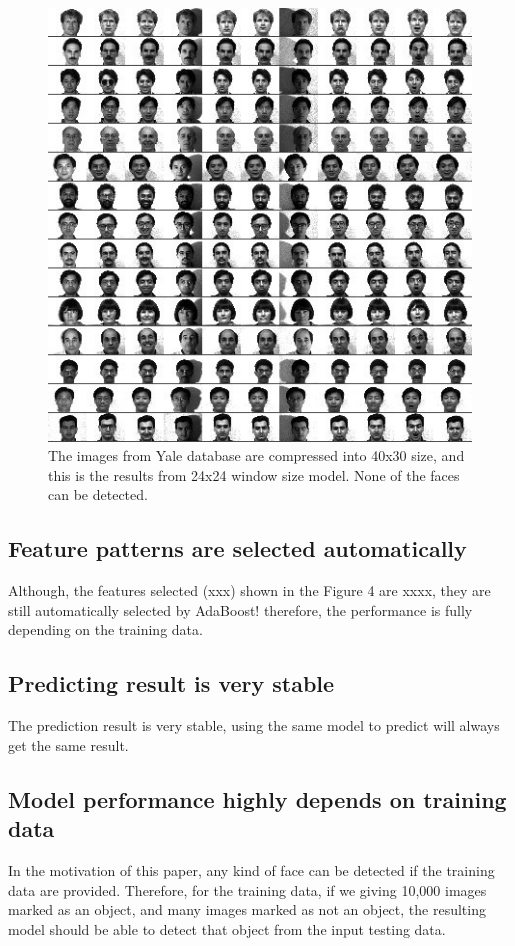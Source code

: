 \documentclass[10pt,twocolumn,letterpaper]{article}
\begin{document}
\begin{figure}[t]
    \begin{center}
        \includegraphics[width=0.9\linewidth]{yaleallsmall_ori}
    \end{center}
    \caption{The images from Yale database are compressed into 40x30 size, and this is the results from 24x24 window size model. None of the faces can be detected.}
    \label{fig:yori}
\end{figure}



\subsection{Feature patterns are selected automatically}
Although, the features selected (xxx) shown in the Figure 4 are xxxx, they are still automatically selected by AdaBoost!
therefore, the performance is fully depending on the training data.

\subsection{Predicting result is very stable}
The prediction result is very stable, using the same model to predict will always get the same result.

\subsection{Model performance highly depends on training data}
In the motivation of this paper, any kind of face can be detected if the training data are provided.
Therefore, for the training data, if we giving 10,000 images marked as an object, and many images marked as not an object,
the resulting model should be able to detect that object from the input testing data.
\end{document}
